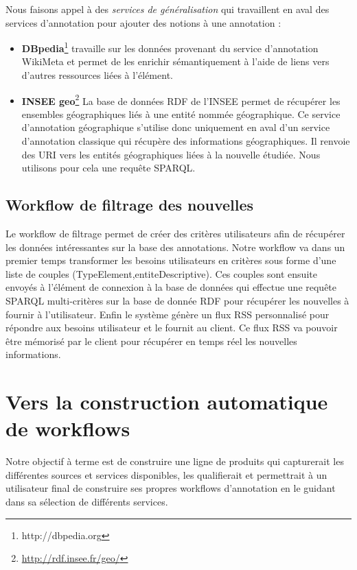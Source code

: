 \documentclass[]{ciel}
\begin{document}
Nous faisons appel à des \textit{services de généralisation} qui travaillent en aval des services d'annotation pour ajouter des notions à une annotation :
\begin{itemize}
	\item \textbf{DBpedia}\footnote{http://dbpedia.org} travaille sur les données provenant du service d'annotation WikiMeta et permet de les enrichir sémantiquement à l'aide de liens vers d'autres ressources liées à l'élément.
  \item \textbf{INSEE geo}\footnote{\url{http://rdf.insee.fr/geo/}} La base de données RDF de l'INSEE permet de récupérer les ensembles géographiques liés à une entité nommée géographique. Ce service d'annotation géographique s'utilise donc uniquement en aval d'un service d'annotation classique qui récupère des informations géographiques. Il renvoie des URI vers les entités géographiques liées à la nouvelle étudiée. Nous utilisons pour cela une requête SPARQL.
\end{itemize}

\subsection{Workflow de filtrage des nouvelles}
Le workflow de filtrage permet de créer des critères utilisateurs afin de récupérer les données intéressantes sur la base des annotations. Notre workflow va dans un premier temps transformer les besoins utilisateurs en critères sous forme d'une liste de couples (TypeElement,entiteDescriptive). Ces couples sont ensuite envoyés à l'élément de connexion à la base de données qui effectue une requête SPARQL multi-critères sur la base de donnée RDF pour récupérer les nouvelles à fournir à l'utilisateur. Enfin le système génère un flux RSS personnalisé pour répondre aux besoins utilisateur et le fournit au client. Ce flux RSS va pouvoir être mémorisé par le client pour récupérer en temps réel les nouvelles informations.

\section{Vers la construction automatique de workflows }
\label{sect:perspectives}
Notre objectif à terme est de construire une ligne de produits qui capturerait les différentes sources et services disponibles, les qualifierait et permettrait à un utilisateur final de construire ses propres workflows d'annotation en le guidant dans sa sélection de différents services.
\end{document}
